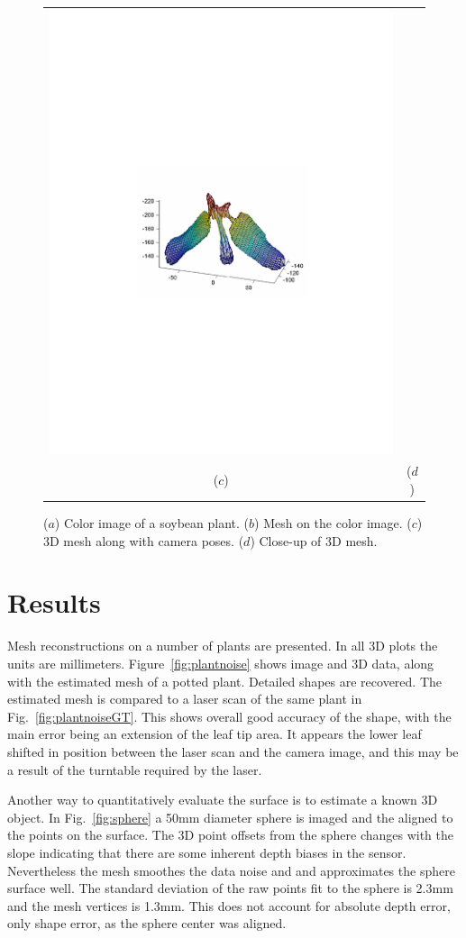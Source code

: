 \begin{figure}
\begin{center}
\begin{tabular}{cc}
\includegraphics[trim=190 280 190 290,clip,width=0.48\linewidth]{Figures/soybean3DMesh} \\
($c$) & ($d$) \\
\end{tabular}
\end{center}
   \caption{($a$) Color image of a soybean plant.  ($b$) Mesh on the color image. ($c$) $3$D mesh along with camera poses. ($d$) Close-up of $3$D mesh.  }
\label{fig:soybean}
\end{figure}


\section{Results}
\label{sec:results}

Mesh reconstructions on a number of plants are presented.  In all 3D plots the units are millimeters.  Figure~\ref{fig:plantnoise} shows image and $3$D data, along with the estimated mesh of a potted plant.  Detailed shapes are recovered. The estimated mesh is compared to a laser scan of the same plant in Fig.~\ref{fig:plantnoiseGT}.  This shows overall good accuracy of the shape, with the main error being an extension of the leaf tip area.  It appears the lower leaf shifted in position between the laser scan and the camera image, and this may be a result of the turntable required by the laser. 

Another way to quantitatively evaluate the surface is to estimate a known $3$D object.  In Fig.~\ref{fig:sphere} a 50mm diameter sphere is imaged and the aligned to the points on the surface.  The $3$D point offsets from the sphere changes with the slope indicating that there are some inherent depth biases in the sensor.  Nevertheless the mesh smoothes the data noise and and approximates the sphere surface well.  The standard deviation of the raw points fit to the sphere is 2.3mm and the mesh vertices is 1.3mm.  This does not account for absolute depth error, only shape error, as the sphere center was aligned.

